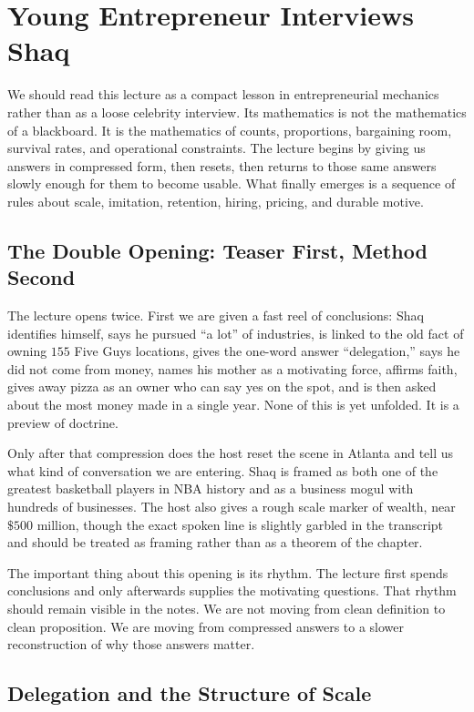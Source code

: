 \chapter{Young Entrepreneur Interviews Shaq}

We should read this lecture as a compact lesson in entrepreneurial mechanics rather than as a loose celebrity interview. Its mathematics is not the mathematics of a blackboard. It is the mathematics of counts, proportions, bargaining room, survival rates, and operational constraints. The lecture begins by giving us answers in compressed form, then resets, then returns to those same answers slowly enough for them to become usable. What finally emerges is a sequence of rules about scale, imitation, retention, hiring, pricing, and durable motive.

\section{The Double Opening: Teaser First, Method Second}

The lecture opens twice. First we are given a fast reel of conclusions: Shaq identifies himself, says he pursued ``a lot'' of industries, is linked to the old fact of owning \(155\) Five Guys locations, gives the one-word answer ``delegation,'' says he did not come from money, names his mother as a motivating force, affirms faith, gives away pizza as an owner who can say yes on the spot, and is then asked about the most money made in a single year. None of this is yet unfolded. It is a preview of doctrine.

Only after that compression does the host reset the scene in Atlanta and tell us what kind of conversation we are entering. Shaq is framed as both one of the greatest basketball players in NBA history and as a business mogul with hundreds of businesses. The host also gives a rough scale marker of wealth, near \(\text{\$}500\) million, though the exact spoken line is slightly garbled in the transcript and should be treated as framing rather than as a theorem of the chapter.

The important thing about this opening is its rhythm. The lecture first spends conclusions and only afterwards supplies the motivating questions. That rhythm should remain visible in the notes. We are not moving from clean definition to clean proposition. We are moving from compressed answers to a slower reconstruction of why those answers matter.

\section{Delegation and the Structure of Scale}

